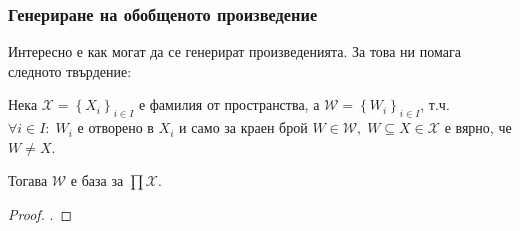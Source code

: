 \subsubsection{Генериране на обобщеното произведение}
Интересно е как могат да се генерират произведенията. За това ни помага следното твърдение:
\begin{proposition}
    Нека $\mathcal X = \left\{X_i\right\}_{i\in I}$ е фамилия от пространства, а $\mathcal W = \left\{W_i\right\}_{i\in I}$, т.ч. $\forall i\in I:\; W_i$ е отворено в $X_i$ и само за краен брой $W \in \mathcal W,\; W \subseteq X \in \mathcal X$ е вярно, че $W \neq X$.

    Тогава $\mathcal W$ е база за $\prod \mathcal X$.
\end{proposition}
\begin{proof}
    \cite[стр.~77]{engelking1989general}.
\end{proof}